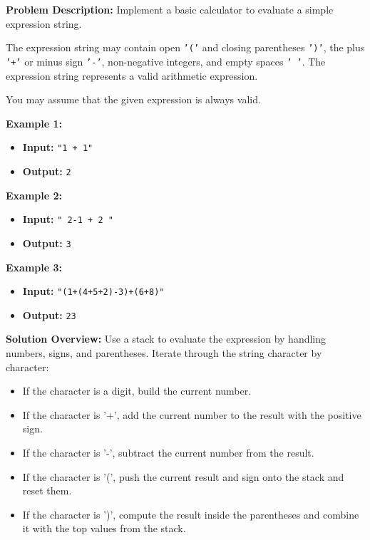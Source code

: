 

\textbf{Problem Description:}  
Implement a basic calculator to evaluate a simple expression string.

The expression string may contain open \texttt{'('} and closing parentheses \texttt{')'}, the plus \texttt{'+'} or minus sign \texttt{'-'}, non-negative integers, and empty spaces \texttt{' '}. The expression string represents a valid arithmetic expression.

You may assume that the given expression is always valid.

\textbf{Example 1:}

\begin{itemize}
    \item \textbf{Input:} \texttt{"1 + 1"}
    \item \textbf{Output:} \texttt{2}
\end{itemize}

\textbf{Example 2:}

\begin{itemize}
    \item \textbf{Input:} \texttt{" 2-1 + 2 "}
    \item \textbf{Output:} \texttt{3}
\end{itemize}

\textbf{Example 3:}

\begin{itemize}
    \item \textbf{Input:} \texttt{"(1+(4+5+2)-3)+(6+8)"}
    \item \textbf{Output:} \texttt{23}
\end{itemize}

\textbf{Solution Overview:}  
Use a stack to evaluate the expression by handling numbers, signs, and parentheses. Iterate through the string character by character:

\begin{itemize}
    \item If the character is a digit, build the current number.
    \item If the character is '+', add the current number to the result with the positive sign.
    \item If the character is '-', subtract the current number from the result.
    \item If the character is '(', push the current result and sign onto the stack and reset them.
    \item If the character is ')', compute the result inside the parentheses and combine it with the top values from the stack.
\end{itemize}

